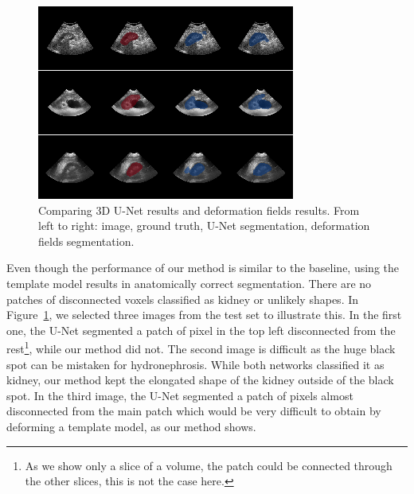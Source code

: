\begin{figure}[htbp]
    \centering
	\includegraphics[width=\textwidth]{img_seg/unet_vs_deform}
    \caption{Comparing 3D U-Net results and deformation fields results. From left to right: image, ground truth, U-Net segmentation, deformation fields segmentation.}
    \label{fig:unet_vs_deform}
\end{figure}

Even though the performance of our method is similar to the baseline, using the template model results in anatomically correct segmentation. There are no patches of disconnected voxels classified as kidney or unlikely shapes. In Figure~\ref{fig:unet_vs_deform}, we selected three images from the test set to illustrate this. In the first one, the U-Net segmented a patch of pixel in the top left disconnected from the rest\footnote{As we show only a slice of a volume, the patch could be connected through the other slices, this is not the case here.}, while our method did not. The second image is difficult as the huge black spot can be mistaken for hydronephrosis. While both networks classified it as kidney, our method kept the elongated shape of the kidney outside of the black spot. In the third image, the U-Net segmented a patch of pixels almost disconnected from the main patch which would be very difficult to obtain by deforming a template model, as our method shows. 

